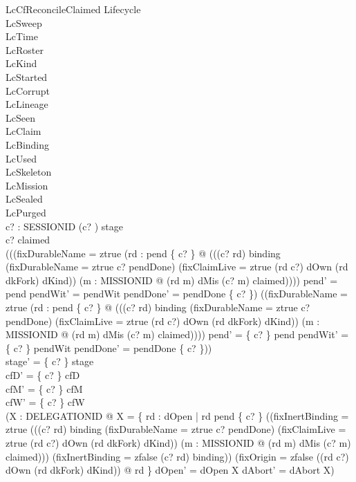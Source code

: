 \documentclass[a4paper,10pt,fleqn]{article}
\begin{document}
\begin{schema}{LcCfReconcileClaimed}
\Delta Lifecycle \\
\Xi LcSweep \\
\Xi LcTime \\
\Xi LcRoster \\
\Xi LcKind \\
\Xi LcStarted \\
\Xi LcCorrupt \\
\Xi LcLineage \\
\Xi LcSeen \\
\Xi LcClaim \\
\Xi LcBinding \\
\Xi LcUsed \\
\Xi LcSkeleton \\
\Xi LcMission \\
\Xi LcSealed \\
\Xi LcPurged \\
c? : SESSIONID
\where
(c? ) \in stage \\
c? \in \dom claimed \\
(((fixDurableName = ztrue \land (\exists rd : pend \limg \{ c? \} \rimg @ (((c? \mapsto rd) \in binding \lor (fixDurableName = ztrue \land c? \in pendDone) \lor (fixClaimLive = ztrue \land (rd \mapsto c?) \in dOwn \land (rd \mapsto dkFork) \in dKind)) \land (\exists m : MISSIONID @ (rd \mapsto m) \in dMis \land (c? \mapsto m) \in claimed)))) \land pend' = pend \land pendWit' = pendWit \land pendDone' = pendDone \cup \{ c? \}) \lor (\lnot (fixDurableName = ztrue \land (\exists rd : pend \limg \{ c? \} \rimg @ (((c? \mapsto rd) \in binding \lor (fixDurableName = ztrue \land c? \in pendDone) \lor (fixClaimLive = ztrue \land (rd \mapsto c?) \in dOwn \land (rd \mapsto dkFork) \in dKind)) \land (\exists m : MISSIONID @ (rd \mapsto m) \in dMis \land (c? \mapsto m) \in claimed)))) \land pend' = \{ c? \} \ndres pend \land pendWit' = \{ c? \} \ndres pendWit \land pendDone' = pendDone \setminus \{ c? \})) \\
stage' = \{ c? \} \ndres stage \\
cfD' = \{ c? \} \ndres cfD \\
cfM' = \{ c? \} \ndres cfM \\
cfW' = \{ c? \} \ndres cfW \\
(\exists X : \power DELEGATIONID @ X = \{ rd : dOpen | rd \in pend \limg \{ c? \} \rimg \land ((fixInertBinding = ztrue \land \lnot (((c? \mapsto rd) \in binding \lor (fixDurableName = ztrue \land c? \in pendDone) \lor (fixClaimLive = ztrue \land (rd \mapsto c?) \in dOwn \land (rd \mapsto dkFork) \in dKind)) \land (\exists m : MISSIONID @ (rd \mapsto m) \in dMis \land (c? \mapsto m) \in claimed))) \lor (fixInertBinding = zfalse \land (c? \mapsto rd) \notin binding)) \land (fixOrigin = zfalse \lor ((rd \mapsto c?) \in dOwn \land (rd \mapsto dkFork) \in dKind)) @ rd \} \land dOpen' = dOpen \setminus X \land dAbort' = dAbort \cup X) \\

\end{schema}
\end{document}
